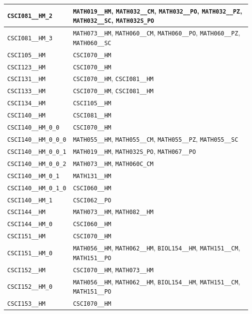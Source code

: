 \begin{longtable}{|p{4.4in}|p{4.4in}|}
    \verb|CSCI081__HM_2| & \verb|MATH019__HM|, \verb|MATH032__CM|, \verb|MATH032__PO|, \verb|MATH032__PZ|, \verb|MATH032__SC|, \verb|MATH032S_PO|\\\hline
    \verb|CSCI081__HM_3| & \verb|MATH073__HM|, \verb|MATH060__CM|, \verb|MATH060__PO|, \verb|MATH060__PZ|, \verb|MATH060__SC|\\\hline
    \verb|CSCI105__HM| & \verb|CSCI070__HM|\\\hline
    \verb|CSCI123__HM| & \verb|CSCI070__HM|\\\hline
    \verb|CSCI131__HM| & \verb|CSCI070__HM|, \verb|CSCI081__HM|\\\hline
    \verb|CSCI133__HM| & \verb|CSCI070__HM|, \verb|CSCI081__HM|\\\hline
    \verb|CSCI134__HM| & \verb|CSCI105__HM|\\\hline
    \verb|CSCI140__HM| & \verb|CSCI081__HM|\\\hline
    \verb|CSCI140__HM_0_0| & \verb|CSCI070__HM|\\\hline
    \verb|CSCI140__HM_0_0_0| & \verb|MATH055__HM|, \verb|MATH055__CM|, \verb|MATH055__PZ|, \verb|MATH055__SC|\\\hline
    \verb|CSCI140__HM_0_0_1| & \verb|MATH019__HM|, \verb|MATH032S_PO|, \verb|MATH067__PO|\\\hline
    \verb|CSCI140__HM_0_0_2| & \verb|MATH073__HM|, \verb|MATH060C_CM|\\\hline
    \verb|CSCI140__HM_0_1| & \verb|MATH131__HM|\\\hline
    \verb|CSCI140__HM_0_1_0| & \verb|CSCI060__HM|\\\hline
    \verb|CSCI140__HM_1| & \verb|CSCI062__PO|\\\hline
    \verb|CSCI144__HM| & \verb|MATH073__HM|, \verb|MATH082__HM|\\\hline
    \verb|CSCI144__HM_0| & \verb|CSCI060__HM|\\\hline
    \verb|CSCI151__HM| & \verb|CSCI070__HM|\\\hline
    \verb|CSCI151__HM_0| & \verb|MATH056__HM|, \verb|MATH062__HM|, \verb|BIOL154__HM|, \verb|MATH151__CM|, \verb|MATH151__PO|\\\hline
    \verb|CSCI152__HM| & \verb|CSCI070__HM|, \verb|MATH073__HM|\\\hline
    \verb|CSCI152__HM_0| & \verb|MATH056__HM|, \verb|MATH062__HM|, \verb|BIOL154__HM|, \verb|MATH151__CM|, \verb|MATH151__PO|\\\hline
    \verb|CSCI153__HM| & \verb|CSCI070__HM|\\\hline

\end{longtable}
